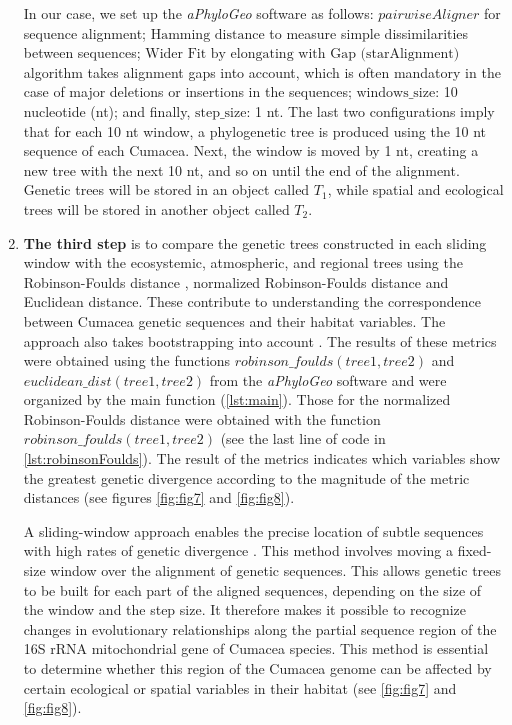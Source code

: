 \begin{enumerate}
In our case, we set up the \textit{aPhyloGeo} software as follows: $pairwiseAligner$ for sequence alignment; $\text{Hamming distance}$ to measure simple dissimilarities between sequences; $\text{Wider Fit by elongating with Gap (starAlignment)}$ algorithm takes alignment gaps into account, which is often mandatory in the case of major deletions or insertions in the sequences; $\text{windows\_size}$: 10 nucleotide (nt); and finally, $\text{step\_size}$: 1 nt. The last two configurations imply that for each 10 nt window, a phylogenetic tree is produced using the 10 nt sequence of each Cumacea. Next, the window is moved by 1 nt, creating a new tree with the next 10 nt, and so on until the end of the alignment. Genetic trees will be stored in an object called $T_1$, while spatial and ecological trees will be stored in another object called $T_2$.

\item \textbf{The third step} is to compare the genetic trees constructed in each sliding window with the ecosystemic, atmospheric, and regional trees using the Robinson-Foulds distance \citep{robinson_comparison_1981}, normalized Robinson-Foulds distance and Euclidean distance. These contribute to understanding the correspondence between Cumacea genetic sequences and their habitat variables. The approach also takes bootstrapping into account \citep{li2024host, li2023aphylogeo, koshkarov_phylogeography_2022}. The results of these metrics were obtained using the functions $robinson\_foulds(tree1, tree2)$ and $euclidean\_dist(tree1, tree2)$ from the \textit{aPhyloGeo} software and were organized by the main function (\autoref{lst:main}). Those for the normalized Robinson-Foulds distance were obtained with the function $robinson\_foulds(tree1, tree2)$ (see the last line of code in \autoref{lst:robinsonFoulds}). The result of the metrics indicates which variables show the greatest genetic divergence according to the magnitude of the metric distances (see figures \ref{fig:fig7} and \ref{fig:fig8}).

A sliding-window approach enables the precise location of subtle sequences with high rates of genetic divergence \citep{li2024host, li2023aphylogeo, koshkarov_phylogeography_2022}. This method involves moving a fixed-size window over the alignment of genetic sequences. This allows genetic trees to be built for each part of the aligned sequences, depending on the size of the window and the step size. It therefore makes it possible to recognize changes in evolutionary relationships along the partial sequence region of the 16S rRNA mitochondrial gene of Cumacea species. This method is essential to determine whether this region of the Cumacea genome can be affected by certain ecological or spatial variables in their habitat (see \autoref{fig:fig7} and \autoref{fig:fig8}).
\end{enumerate}

